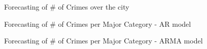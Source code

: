 \documentclass[12pt]{beamer}
\begin{document}
        \begin{frame}{Forecasting of \# of Crimes over the city}
            \begin{figure}
                \centering
            \end{figure}
        \end{frame}

        \begin{frame}{Forecasting of \# of Crimes per Major Category - AR model}
            \begin{figure}
                \centering
            \end{figure}
        \end{frame}

        \begin{frame}{Forecasting of \# of Crimes per Major Category - ARMA model}
            \begin{figure}
                \centering
            \end{figure}
        \end{frame}
\end{document}
